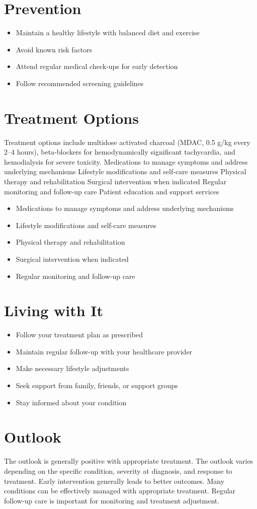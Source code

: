\section{Prevention}
\begin{itemize}[noitemsep]
  \item Maintain a healthy lifestyle with balanced diet and exercise
  \item Avoid known risk factors
  \item Attend regular medical check-ups for early detection
  \item Follow recommended screening guidelines
\end{itemize}
\section{Treatment Options}
Treatment options include multidose activated charcoal (MDAC, 0.5 g/kg every 2--4 hours), beta-blockers for hemodynamically significant tachycardia, and hemodialysis for severe toxicity. Medications to manage symptoms and address underlying mechanisms Lifestyle modifications and self-care measures Physical therapy and rehabilitation Surgical intervention when indicated Regular monitoring and follow-up care Patient education and support services

\begin{itemize}[noitemsep]
  \item Medications to manage symptoms and address underlying mechanisms
  \item Lifestyle modifications and self-care measures
  \item Physical therapy and rehabilitation
  \item Surgical intervention when indicated
  \item Regular monitoring and follow-up care
\end{itemize}
\section{Living with It}
\begin{itemize}[noitemsep]
  \item Follow your treatment plan as prescribed
  \item Maintain regular follow-up with your healthcare provider
  \item Make necessary lifestyle adjustments
  \item Seek support from family, friends, or support groups
  \item Stay informed about your condition
\end{itemize}
\section{Outlook}
The outlook is generally positive with appropriate treatment. The outlook varies depending on the specific condition, severity at diagnosis, and response to treatment. Early intervention generally leads to better outcomes. Many conditions can be effectively managed with appropriate treatment. Regular follow-up care is important for monitoring and treatment adjustment.
